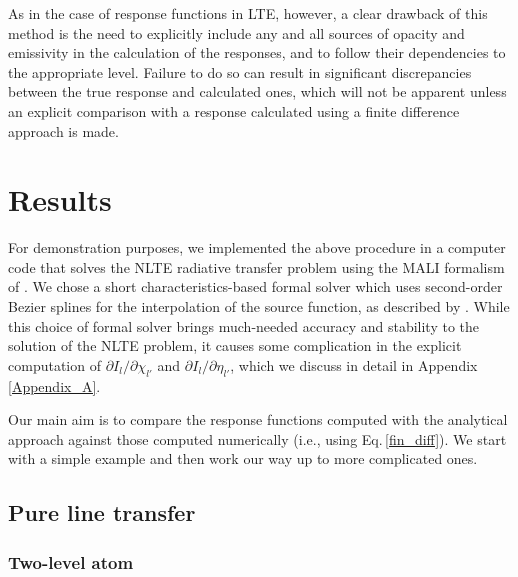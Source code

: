 \documentclass[referee]{aa}
\begin{document}
As in the case of response functions in LTE, however, a clear drawback of this method is the need to explicitly include any and all sources of opacity and emissivity in the calculation of the responses, and to follow their dependencies to the appropriate level. Failure to do so can result in significant discrepancies between the true response and calculated ones, which will not be apparent unless an explicit comparison with a response calculated using a finite difference approach is made.

\section{Results}

For demonstration purposes, we  implemented the above procedure in a computer code that solves the NLTE radiative transfer problem using the MALI formalism of \citet{RH1}. We  chose a short characteristics-based formal solver which uses second-order Bezier splines for the interpolation of the source function, as described by \citet{JaimeBezier}. While this choice of formal solver brings much-needed accuracy and stability to the solution of the NLTE problem, it causes some complication in the explicit computation of $\partial I_l/\partial \chi_{l'}$ and $\partial I_l/\partial \eta_{l'}$,  which we discuss in detail in Appendix\,\ref{Appendix_A}.

Our main aim is to compare the response functions computed with the analytical approach against those computed numerically (i.e., using Eq.\,\ref{fin_diff}). We start with a simple example and then work our way up to more complicated ones. 

\subsection{Pure line transfer}

\subsubsection{Two-level atom}
\end{document}
